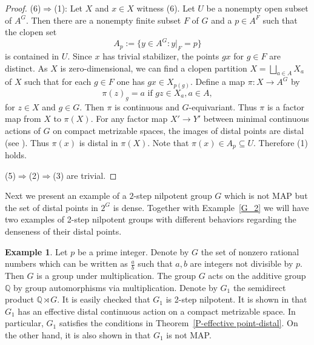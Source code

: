 \documentclass[11pt]{amsart}
\theoremstyle{definition}
\newtheorem{example}[theorem]{Example}
\numberwithin{equation}{section}
\theoremstyle{definition}
\newcommand{\Qb}{{\mathbb Q}}
\begin{document}
\begin{proof}
(6)$\Rightarrow$(1): Let $X$ and $x\in X$ witness (6). Let $U$ be a nonempty open subset of $A^G$. Then there are a nonempty finite subset $F$ of $G$ and a $p\in A^F$ such that the clopen set 
$$A_p:=\{y\in A^G: y|_F=p\}$$
is contained in $U$. Since $x$ has trivial stabilizer, the points $gx$ for $g\in F$ are distinct. As $X$ is zero-dimensional, we can find a clopen partition $X=\bigsqcup_{a\in A} X_a$ of $X$ such that for each $g\in F$ one has $gx\in X_{p(g)}$. Define a map $\pi: X\rightarrow A^G$ by
$$\pi(z)_g=a \mbox{ if } gz\in X_a, a\in A,$$ 
for $z\in X$ and $g\in G$. Then $\pi$ is continuous and $G$-equivariant. Thus $\pi$ is a factor map from $X$ to $\pi(X)$. For any factor map $X'\rightarrow Y'$ between minimal continuous actions of $G$ on compact metrizable spaces, the images of distal points are distal (see \cite[Corollary IV.3.25.2]{deVries}). Thus $\pi(x)$ is distal in $\pi(X)$. Note that $\pi(x)\in A_p\subseteq U$. Therefore (1) holds. 

(5)$\Rightarrow$(2)$\Rightarrow$(3) are trivial. 
\end{proof}

Next we present an example of a $2$-step nilpotent group $G$ which is not MAP but the set of distal points in $2^G$ is dense. Together with Example~\ref{G_2} we will have two examples of 2-step nilpotent groups with different behaviors regarding the denseness of their distal points. 

\begin{example}\label{E-effective point-distal action}
Let $p$ be a prime integer. Denote by $G$ the set of nonzero rational numbers which can be written as $\frac{a}{b}$ such that $a, b$ are integers not divisible by $p$. Then $G$ is a group under multiplication. The group $G$ acts on the additive group $\Qb$ by group automorphisms via multiplication. Denote by $G_1$ the semidirect product $\mathbb{Q}\rtimes G$. It is easily checked that $G_1$ is 2-step nilpotent. It is shown in \cite[Example 4.6]{Abels83} that $G_1$ has an effective distal continuous action on a compact metrizable space. In particular, $G_1$ satisfies the conditions in Theorem~\ref{P-effective point-distal}. On the other hand, it is also shown in \cite[Example 4.6]{Abels83} that $G_1$ is not MAP. 
\end{example}
\end{document}
